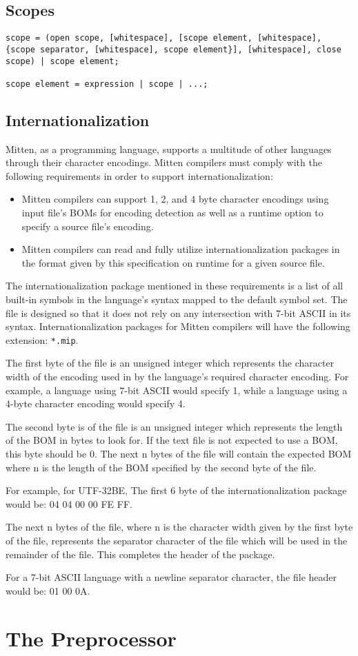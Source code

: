 \documentclass[10pt,a4paper]{article}
\begin{document}
\subsection{Scopes}
\begin{verbatim}
scope = (open scope, [whitespace], [scope element, [whitespace], {scope separator, [whitespace], scope element}], [whitespace], close scope) | scope element;

scope element = expression | scope | ...;
\end{verbatim}

\subsection{Internationalization}
Mitten, as a programming language, supports a multitude of other languages through their character encodings. Mitten compilers must comply with the following requirements in order to support internationalization:
\begin{itemize}
\item Mitten compilers can support 1, 2, and 4 byte character encodings using input file's BOMs for encoding detection as well as a runtime option to specify a source file's encoding.
\item Mitten compilers can read and fully utilize internationalization packages in the format given by this specification on runtime for a given source file.
\end{itemize}

The internationalization package mentioned in these requirements is a list of all built-in symbols in the language's syntax mapped to the default symbol set. The file is designed so that it does not rely on any intersection with 7-bit ASCII in its syntax. Internationalization packages for Mitten compilers will have the following extension: \verb|*.mip|. 

The first byte of the file is an unsigned integer which represents the character width of the encoding used in by the language's required character encoding. For example, a language using 7-bit ASCII would specify 1, while a language using a 4-byte character encoding would specify 4.

The second byte is of the file is an unsigned integer which represents the length of the BOM in bytes to look for. If the text file is not expected to use a BOM, this byte should be 0. The next n bytes of the file will contain the expected BOM where n is the length of the BOM specified by the second byte of the file.

For example, for UTF-32BE, The first 6 byte of the internationalization package would be: 04 04 00 00 FE FF.

The next n bytes of the file, where n is the character width given by the first byte of the file, represents the separator character of the file which will be used in the remainder of the file. This completes the header of the package.

For a 7-bit ASCII language with a newline separator character, the file header would be: 01 00 0A.

\section{The Preprocessor}
\end{document}
